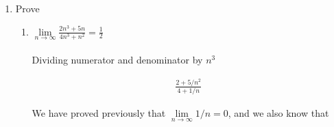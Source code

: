 \documentclass[11pt, letterpaper]{article}
\begin{document}
\begin{enumerate}
\item{Prove
	\begin{enumerate}
		\item{$\displaystyle{\lim \limits_{n \to \infty} \frac{2n^3+5n}{4n^3+n^2}=\frac{1}{2}}$ \\\\
			Dividing numerator and denominator by $n^3$
			
			\setcounter{equation}{0}
			
			\begin{eqnarray}
				\frac{2 + 5/n^2}{4 + 1/n}
			\end{eqnarray}					
			
			We have proved previously that $\lim \limits_{n \to \infty} 1/n = 0$, and we also know that 
			
}
\end{enumerate}}
\end{enumerate}
\end{document}
